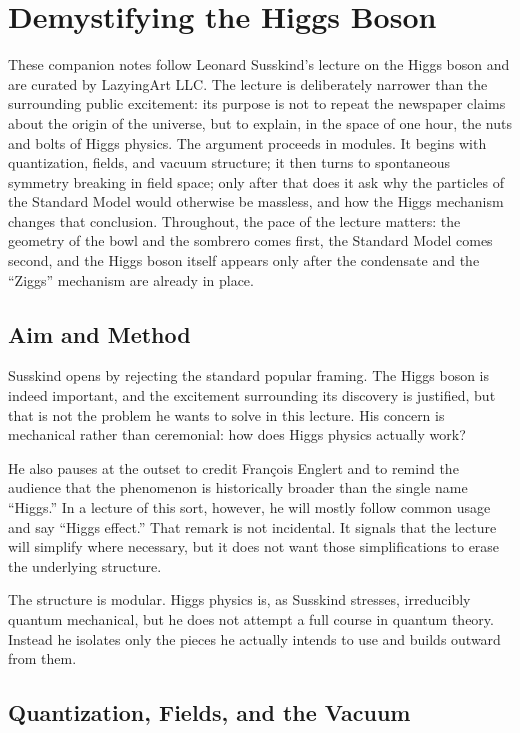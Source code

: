 \chapter{Demystifying the Higgs Boson}

These companion notes follow Leonard Susskind's lecture on the Higgs boson and are curated by LazyingArt LLC. The lecture is deliberately narrower than the surrounding public excitement: its purpose is not to repeat the newspaper claims about the origin of the universe, but to explain, in the space of one hour, the nuts and bolts of Higgs physics. The argument proceeds in modules. It begins with quantization, fields, and vacuum structure; it then turns to spontaneous symmetry breaking in field space; only after that does it ask why the particles of the Standard Model would otherwise be massless, and how the Higgs mechanism changes that conclusion. Throughout, the pace of the lecture matters: the geometry of the bowl and the sombrero comes first, the Standard Model comes second, and the Higgs boson itself appears only after the condensate and the ``Ziggs'' mechanism are already in place.

\section{Aim and Method}

Susskind opens by rejecting the standard popular framing. The Higgs boson is indeed important, and the excitement surrounding its discovery is justified, but that is not the problem he wants to solve in this lecture. His concern is mechanical rather than ceremonial: how does Higgs physics actually work?

He also pauses at the outset to credit Fran\c{c}ois Englert and to remind the audience that the phenomenon is historically broader than the single name ``Higgs.'' In a lecture of this sort, however, he will mostly follow common usage and say ``Higgs effect.'' That remark is not incidental. It signals that the lecture will simplify where necessary, but it does not want those simplifications to erase the underlying structure.

The structure is modular. Higgs physics is, as Susskind stresses, irreducibly quantum mechanical, but he does not attempt a full course in quantum theory. Instead he isolates only the pieces he actually intends to use and builds outward from them.

\section{Quantization, Fields, and the Vacuum}

